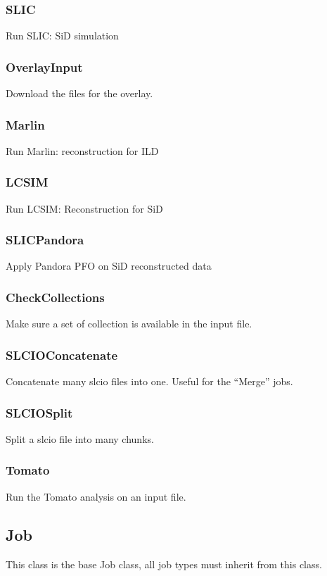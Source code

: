 \documentclass[a4paper,12pt]{article}
\begin{document}
\subsubsection{SLIC}\label{slic}
Run SLIC: SiD simulation

\subsubsection{OverlayInput}\label{overlay}
Download the files for the overlay.

\subsubsection{Marlin}\label{marlin}
Run Marlin: reconstruction for ILD

\subsubsection{LCSIM}\label{lcsim}
Run LCSIM: Reconstruction for SiD

\subsubsection{SLICPandora}\label{slicpan}
Apply Pandora PFO on SiD reconstructed data

\subsubsection{CheckCollections}\label{checkcoll}
Make sure a set of collection is available in the input file.

\subsubsection{SLCIOConcatenate}\label{slcioconcat}
Concatenate many slcio files into one. Useful for the ``Merge'' jobs. 

\subsubsection{SLCIOSplit}\label{slciosplit}
Split a slcio file into many chunks. 

\subsubsection{Tomato}\label{tomato}
Run the Tomato analysis on an input file.

\subsection{Job}\label{job}
This class is the base Job class, all job types must inherit from this class.
\end{document}

